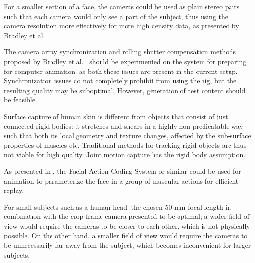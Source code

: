 For a smaller section of a face, the cameras could be used as plain stereo pairs such that each camera would only see a part of the subject, thus using the camera resolution more effectively for more high density data, as presented by Bradley et al.\ \cite{bradley2010high}

The camera array synchronization and rolling shutter compensation methods proposed by Bradley et al.\ \cite{bradley2009synchronization} should be experimented on the system for preparing for computer animation, as both these issues are present in the current setup.
Synchronization issues do not completely prohibit from using the rig, but the resulting quality may be suboptimal.
However, generation of test content should be feasible.


Surface capture of human skin is different from objects that consist of just connected rigid bodies: it stretches and shears in a highly non-predicatable way such that both its local geometry and texture changes, affected by the sub-surface properties of muscles etc.
Traditional methods for tracking rigid objects are thus not viable for high quality.
Joint motion capture has the rigid body assumption.

As presented in \cite{deng2007computer}, the Facial Action Coding System or similar could be used for animation to parameterize the face in a group of muscular actions for efficient replay.

For small subjects such as a human head, the chosen 50 mm focal length in combination with the crop frame camera presented to be optimal; a wider field of view would require the cameras to be closer to each other, which is not physically possible.
On the other hand, a smaller field of view would require the cameras to be unnecessarily far away from the subject, which becomes inconvenient for larger subjects.

